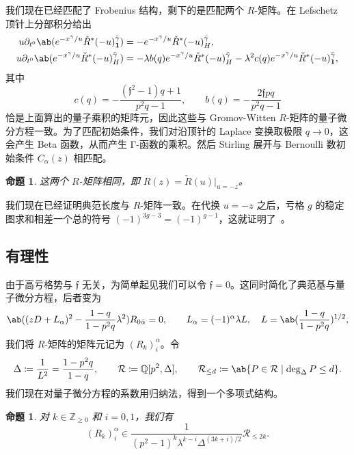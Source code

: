 \documentclass{amsart}
\newtheorem{prop}[thm]{命题}
\theoremstyle{definition}
\theoremstyle{remark}
\theoremstyle{plain}
\theoremstyle{definition}
\theoremstyle{remark}
\newcommand{\Z}{\mathbb{Z}}
\newcommand{\Q}{\mathbb{Q}}
\newcommand{\mc}[1]{\mathcal{#1}}
\newcommand{\mf}[1]{\mathfrak{#1}}
\newcommand{\1}{\mathbf{1}}
\newcommand{\2}{\mathbf{2}}
\newcommand{\3}{\mathbf{3}}
\begin{document}
我们现在已经匹配了 Frobenius 结构，剩下的是匹配两个 \(R\)-矩阵。在 Lefschetz 顶针上分部积分给出
\begin{align*}
    u \partial_{t^0}\ab(e^{-x^{\gamma}/u}\check{R}^*(-u)^{\bar{\gamma}}_{\1}) &= -e^{-x^{\gamma}/u}\check{R}^*(-u)^{\bar{\gamma}}_H, \\
    u\partial_{t^0}\ab(e^{-x^{\gamma}/u}\check{R}^*(-u)^{\bar{\gamma}}_H) &= -\lambda b(q)e^{-x^{\gamma}/u}\check{R}^*(-u)^{\bar{\gamma}}_H - \lambda^2 c(q) e^{-x^{\gamma}/u}\check{R}^*(-u)^{\bar{\gamma}}_{\1},
\end{align*}
其中
\[ c(q) = -\frac{(\mf{f}^2-1)q+1}{p^2q-1}, \qquad b(q) = -\frac{2\mf{f}pq}{p^2q-1} \]
恰是上面算出的量子乘积的矩阵元，因此这些与 Gromov-Witten \(R\)-矩阵的量子微分方程一致。为了匹配初始条件，我们对沿顶针的 Laplace 变换取极限 \(q \to 0\)，这会产生 Beta 函数，从而产生 Γ-函数的乘积。然后 Stirling 展开与 Bernoulli 数初始条件 \(C_{\alpha}(z)\) 相匹配。

\begin{prop}%
\label{prop:R matrices coincide}
    这两个 \(R\)-矩阵相同，即 \(R(z) = \check{R}(u)|_{u=-z}\)。
\end{prop}

我们现在已经证明典范长度与 \(R\)-矩阵一致。在代换 \(u = -z\) 之后，亏格 \(g\) 的稳定图求和相差一个总的符号 \((-1)^{3g-3} = (-1)^{g-1}\)，这就证明了~。

\subsection{有理性}%
\label{sub:Rationality}

由于高亏格势与 \(\mf{f}\) 无关，为简单起见我们可以令 \(\mf{f} = 0\)。这同时简化了典范基与量子微分方程，后者变为
\[ \ab((zD+L_{\alpha})^2 - \frac{1-q}{1-p^2q}\lambda^2)R_{0\bar{\alpha}} = 0, \qquad L_{\alpha} = (-1)^{\alpha}\lambda L, \quad L = \ab(\frac{1-q}{1-p^2q})^{1/2}, \]
我们将 \(R\)-矩阵的矩阵元记为 \((R_k)_i^{\alpha}\)。令
\[ \Delta \coloneqq \frac{1}{L^2} = \frac{1-p^2q}{1-q}, \qquad \mc{R} \coloneqq \Q[p^2,\Delta], \qquad \mc{R}_{\leq d} \coloneqq \ab\{P \in \mc{R} \mid \deg_{\Delta} P \leq d\}. \]
我们现在对量子微分方程的系数用归纳法，得到一个多项式结构。

\begin{prop}%
\label{prop:R matrix polynomiality}
    对 \(k \in \Z_{\geq0}\) 和 \(i = 0,1\)，我们有
    \[ (R_k)_i^{\alpha} \in \frac{1}{(p^2-1)^k \lambda^{k-i}\Delta^{(3k+i)/2}}\mc{R}_{\leq 2k}. \]
\end{prop}
\end{document}
